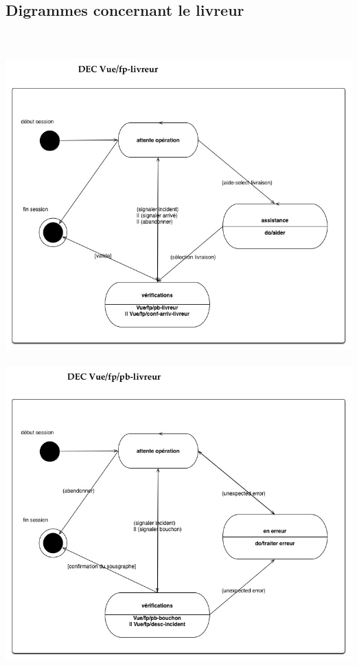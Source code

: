 \documentclass{report}
\begin{document}
\subsection{Digrammes concernant le livreur}
~~\\
~~\\
\includegraphics[scale = 0.75]{images/dec-livreur-principale.jpg}

\paragraph{}

\includegraphics[scale = 0.75]{images/dec-livreur-probleme.jpg}
\end{document}
